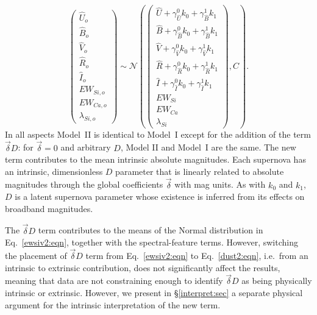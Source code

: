 \documentclass{aastex61}   	%
\begin{document}
\begin{equation}
\begin{pmatrix}
{\hat{U}}_o\\{\hat{B}}_o\\ {\hat{V}}_o\\{\hat{R}}_o\\{\hat{I}}_o\\EW_{Si, o}\\ EW_{Ca, o} \\ \lambda_{Si, o}
\end{pmatrix}
\sim \mathcal{N}
\left(
\begin{pmatrix}
{\hat{U}} +\gamma^0_{{\hat{U}}} k_0 +\gamma^1_{{\hat{B}}} k_1 \\{\hat{B}} +\gamma^0_{{\hat{B}}} k_0 +\gamma^1_{{\hat{B}}} k_1 \\
{\hat{V}}+\gamma^0_{{\hat{V}}} k_0+\gamma^1_{{\hat{V}}} k_1\\{\hat{R}}+\gamma^0_{{\hat{R}}} k_0 + \gamma^1_{{\hat{R}}} k_1\\{\hat{I}}+\gamma^0_{{\hat{I}}} k_0+\gamma^1_{{\hat{I}}} k_1\\
EW_{Si}\\ EW_{Ca} \\ \lambda_{Si}
\end{pmatrix}
,C
\right).
\label{dust2:eqn}
\end{equation}
In all aspects Model~II is identical to Model~I except for the addition of the term $\vec{\delta} D$: for $\vec{\delta}=0$ and arbitrary $D$, Model II
and Model~I are the same.
The new term contributes to the mean intrinsic
absolute magnitudes. 
Each supernova has an intrinsic,
\color{red}
dimensionless
\color{black}
$D$ parameter that is linearly related to
absolute magnitudes through the global coefficients $\vec{\delta}$
\color{red}
with mag units. 
\color{black}
As with $k_0$ and $k_1$,  $D$ is a latent supernova parameter whose existence is inferred from
its effects on broadband magnitudes.


The $\vec{\delta} D$ term contributes to the means of the Normal distribution in Eq.~\ref{ewsiv2:eqn}, together with the spectral-feature terms.
However, switching the placement of 
$\vec{\delta} D$ term from Eq.~\ref{ewsiv2:eqn} to Eq.~\ref{dust2:eqn}, i.e.\ from an intrinsic to extrinsic contribution,
does not significantly affect the results, meaning that data are not constraining enough
to identify $\vec{\delta} D$ as being physically intrinsic or extrinsic.
However, we present in \S\ref{interpret:sec} a separate physical argument for the intrinsic interpretation of the new term.
\end{document}
